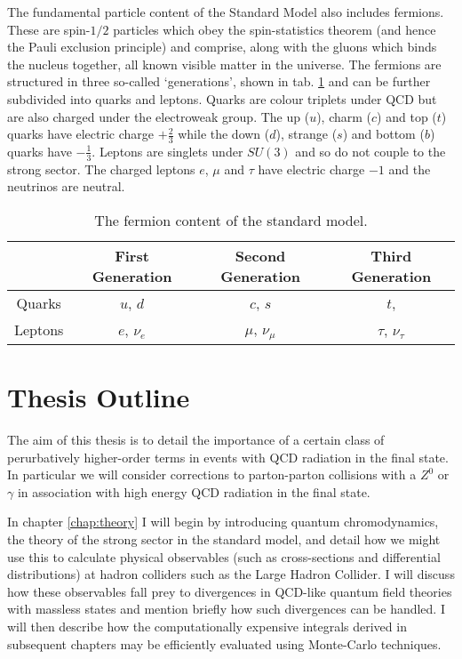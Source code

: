 	The fundamental particle content of the Standard Model also includes fermions. These are spin-$1/2$
	particles which obey the spin-statistics theorem (and hence the Pauli exclusion principle) and
	comprise, along with the gluons which binds the nucleus together, all known visible matter in the
	universe. The fermions are structured in three so-called `generations', shown in tab. \ref{tab:fermions}
	and can be further subdivided into quarks and leptons. Quarks are colour triplets under QCD but are
	also charged under the electroweak group.  The up ($u$), charm ($c$) and top ($t$) quarks have electric
	charge $+\frac{2}{3}$ while the down ($d$), strange ($s$) and bottom ($b$) quarks have $-\frac{1}{3}$.
	Leptons are singlets under $SU(3)$ and so do not couple to the strong sector.  The charged leptons
	$e$, $\mu$ and $\tau$ have electric charge $-1$ and the neutrinos are neutral.

	\begin{table}[hbt!]
	\begin{center}
	\begin{tabular}{c | c | c | c}
	        & First Generation & Second Generation & Third Generation   \\ \hline
	Quarks  &  $u$, $d$        & $c$, $s$          & $t$,               \\ \hline
	Leptons &  $e$, $\nu_e$    & $\mu$, $\nu_\mu$  & $\tau$, $\nu_\tau$ \\
	\end{tabular}
	\caption{The fermion content of the standard model.}
	\label{tab:fermions}
	\end{center}
	\end{table}

\section{Thesis Outline}
	\label{sec:outline}

	The aim of this thesis is to detail the importance of a certain class of perurbatively higher-order terms
	in events with QCD radiation in the final state.  In particular we will consider corrections to parton-parton
	collisions with a $Z^0$ or $\gamma$ in association with high energy QCD radiation in the final state.

	In chapter \ref{chap:theory} I will begin by introducing quantum chromodynamics, the theory of the strong
	sector in the standard model, and detail how we might use this to calculate physical observables (such as
	cross-sections and differential distributions) at hadron colliders such as the Large Hadron Collider.  I
	will discuss how these observables fall prey to divergences in QCD-like quantum field theories with massless
	states and mention briefly how such divergences can be handled.  I will then describe how the computationally
	expensive integrals derived in subsequent chapters may be efficiently evaluated using Monte-Carlo techniques.

